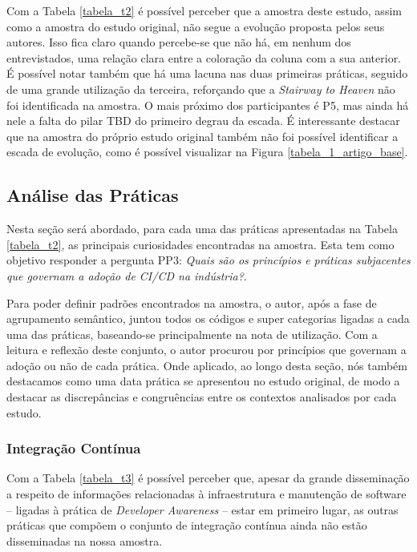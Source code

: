 Com a Tabela \ref{tabela_t2} é possível perceber que a amostra deste estudo, assim como a amostra do estudo original, não segue a evolução proposta pelos seus autores. Isso fica claro quando percebe-se que não há, em nenhum dos entrevistados, uma relação clara entre a coloração da coluna com a sua anterior. É possível notar também que há uma lacuna nas duas primeiras práticas, seguido de uma grande utilização da terceira, reforçando que a \emph{Stairway to Heaven} não foi identificada na amostra. O mais próximo dos participantes é P5, mas ainda há nele a falta do pilar TBD do primeiro degrau da escada. É interessante destacar que na amostra do próprio estudo original também não foi possível identificar a escada de evolução, como é possível visualizar na Figura \ref{tabela_1_artigo_base}.

\subsection{Análise das Práticas}

Nesta seção será abordado, para cada uma das práticas apresentadas na Tabela \ref{tabela_t2}, as principais curiosidades encontradas na amostra. Esta tem como objetivo responder a pergunta PP3: \emph{Quais são os princípios e práticas subjacentes que governam a adoção de CI/CD na indústria?}.

Para poder definir padrões encontrados na amostra, o autor, após a fase de agrupamento semântico, juntou todos os códigos e super categorias ligadas a cada uma das práticas, baseando-se principalmente na nota de utilização. Com a leitura e reflexão deste conjunto, o autor procurou por princípios que governam a adoção ou não de cada prática. Onde aplicado, ao longo desta seção, nós também destacamos como uma data prática se apresentou no estudo original, de modo a destacar as discrepâncias e congruências entre os contextos analisados por cada estudo.

\subsubsection{Integração Contínua}

Com a Tabela \ref{tabela_t3} é possível perceber que, apesar da grande disseminação a respeito de informações relacionadas à infraestrutura e manutenção de software -- ligadas à prática de \emph{Developer Awareness} \cite{awa} -- estar em primeiro lugar, as outras práticas que compõem o conjunto de integração contínua ainda não estão disseminadas na nossa amostra.

